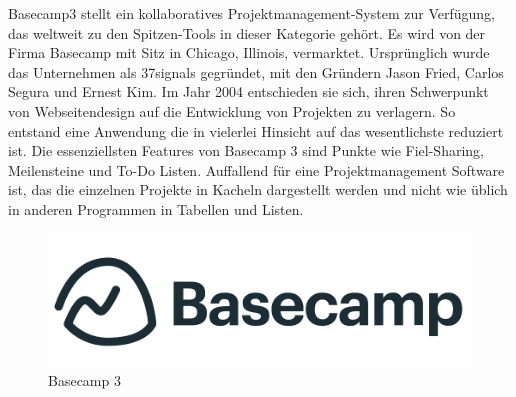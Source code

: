Basecamp3  stellt ein kollaboratives Projektmanagement-System zur Verfügung, das weltweit zu den Spitzen-Tools in dieser Kategorie gehört. Es wird von der Firma Basecamp mit Sitz in Chicago, Illinois, vermarktet. Ursprünglich wurde das Unternehmen als 37signals gegründet, mit den Gründern Jason Fried, Carlos Segura und Ernest Kim. Im Jahr 2004 entschieden sie sich, ihren Schwerpunkt von Webseitendesign auf die Entwicklung von Projekten zu verlagern.
So entstand eine Anwendung die in vielerlei Hinsicht auf das wesentlichste reduziert ist. Die essenziellsten Features von Basecamp 3 sind Punkte wie Fiel-Sharing, Meilensteine und To-Do Listen. Auffallend für eine Projektmanagement Software ist, das die einzelnen Projekte in Kacheln dargestellt werden und nicht wie üblich in anderen Programmen in Tabellen und Listen.


\begin{figure}[h!]
    \centering
    \includegraphics[width=0.7\linewidth]{pics/basecamp.png}
    \caption{Basecamp 3}
    \label{fig:enter-label}
\end{figure}





